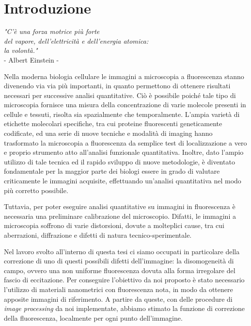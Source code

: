 \clearpage{\pagestyle{empty}\cleardoublepage}

\chapter*{Introduzione} 

\begin{flushright}\begin{small}\textit{"C'è una forza motrice più forte\\ del vapore, dell'elettricità e dell'energia atomica:\\ la volontà."}\\
- Albert Einstein -\\
\end{small}\end{flushright}

Nella moderna biologia cellulare le immagini a microscopia a fluorescenza stanno divenendo via via più importanti, in quanto permettono di ottenere risultati necessari per successive analisi quantitative.
Ciò è possibile poiché tale tipo di microscopia fornisce una misura della concentrazione di varie molecole presenti in cellule e tessuti, risolta sia spazialmente che temporalmente.
L'ampia varietà di etichette molecolari specifiche, tra cui proteine fluorescenti geneticamente codificate, ed una serie di nuove tecniche e modalità di imaging hanno trasformato la microscopia a fluorescenza da semplice test di localizzazione a vero e proprio strumento atto all'analisi funzionale quantitativa.
Inoltre, dato l'ampio utilizzo di tale tecnica ed il rapido sviluppo di nuove metodologie, è diventato fondamentale per la maggior parte dei biologi essere in grado di valutare criticamente le immagini acquisite, effettuando un'analisi quantitativa nel modo più corretto possibile.

Tuttavia, per poter eseguire analisi quantitative su immagini in fluorescenza è necessaria una preliminare calibrazione del microscopio.
Difatti, le immagini a microscopia soffrono di varie distorsioni, dovute a molteplici cause, tra cui aberrazioni, diffrazione e difetti di natura tecnico-sperimentale.

Nel lavoro svolto all'interno di questa tesi ci siamo occupati in particolare della correzione di uno di questi possibili difetti dell'immagine: la disomogeneità di campo, ovvero una non uniforme fluorescenza dovuta alla forma irregolare del fascio di eccitazione. 
Per conseguire l'obiettivo da noi proposto è stato necessario l'utilizzo di materiali nanometrici con fluorescenza nota, in modo da ottenere apposite immagini di riferimento. 
A partire da queste, con delle procedure di \textit{image processing} da noi implementate, abbiamo stimato la funzione di correzione della fluorescenza, localmente per ogni punto dell'immagine.

